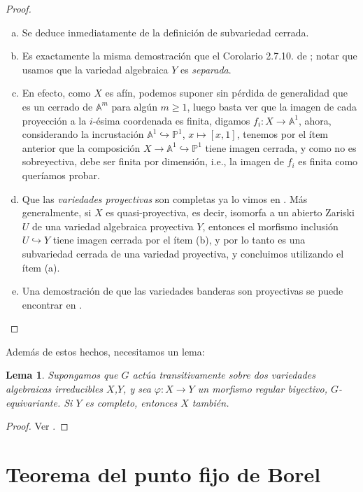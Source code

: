 \documentclass[spanish,12pt]{amsart}
\newtheorem{lemma}[theorem]{Lema}
\theoremstyle{definition}
\theoremstyle{remark}
\numberwithin{equation}{section}
\newcommand{\afine}[1]{\mathbb{A}^{#1}}
\newcommand{\projective}[1]{\mathbb{P}^{#1}}
\begin{document}
\begin{proof}
\begin{enumerate}[(a)]
\item Se deduce inmediatamente de la definición de subvariedad cerrada.
\item Es exactamente la misma demostración que el Corolario 2.7.10. de \cite{notas_pedro}; notar que usamos que la variedad algebraica $Y$ es \textit{separada}.
\item En efecto, como $X$ es afín, podemos suponer sin pérdida de generalidad que es un cerrado de $\afine m$ para algún $m \geq 1$, luego basta ver que la imagen de cada proyección a la $i$-ésima coordenada es finita, digamos $f_i : X \to \afine 1$, ahora, considerando la incrustación $\afine 1 \hookrightarrow \projective 1$, $x \mapsto [x, 1]$, tenemos por el ítem anterior que la composición $X \to \afine 1 \hookrightarrow \projective 1$ tiene imagen cerrada, y como no es sobreyectiva, debe ser finita por dimensión, i.e., la imagen de $f_i$ es finita como queríamos probar.
\item Que las \textit{variedades proyectivas} son completas ya lo vimos en \cite[Teorema \emph{2.7.9}]{notas_pedro}. Más generalmente, si $X$ es quasi-proyectiva, es decir, isomorfa a un abierto Zariski $U$ de una variedad algebraica proyectiva $Y$, entonces el morfismo inclusión $U \hookrightarrow Y$ tiene imagen cerrada por el ítem (b), y por lo tanto es una subvariedad cerrada de una variedad proyectiva, y concluimos utilizando el ítem (a).
\item Una demostración de que las variedades banderas son proyectivas se puede encontrar en \cite[Teorema 3.3.11]{geckMeinolf2013introductionToAlgebraicGeometryAndAlgebraicGroups}.
\end{enumerate}
\end{proof}

Además de estos hechos, necesitamos un lema:

\begin{lemma}\label{lema:lema para variedades completas}
Supongamos que $G$ actúa transitivamente sobre dos variedades algebraicas irreducibles $X$,$Y$, y sea $\varphi : X \to Y$ un morfismo regular biyectivo, $G$-equivariante. Si $Y$ es completo, entonces $X$ también.
\end{lemma}
\begin{proof}
Ver \cite[Lema \S 21.1]{humphreys2012linearAlgebraicGroups}.
\end{proof}


\section{Teorema del punto fijo de Borel}
\end{document}
